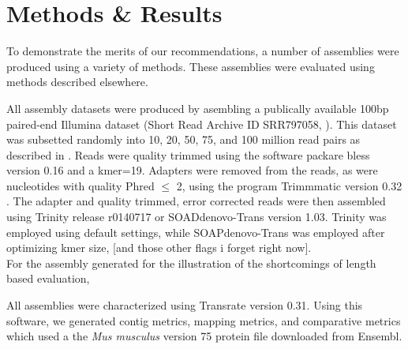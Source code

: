 \section*{Methods & Results}

To demonstrate the merits of our recommendations, a number of assemblies were produced using a variety of methods. These assemblies were evaluated using methods described elsewhere. 

All assembly datasets were produced by asembling a publically available 100bp paired-end Illumina dataset (Short Read Archive ID SRR797058, \citep{Macfarlan:2012js}). This dataset was subsetted randomly into 10, 20, 50, 75, and 100 million read pairs as described in \citep{MacManes:2014io}. Reads were quality trimmed using the software packare bless version 0.16 \citep{Heo:2014cb} and a kmer=19.  Adapters were removed from the reads, as were nucleotides with quality Phred $\leq$ 2, using the program Trimmmatic version 0.32 \citep{Bolger:2014ek}. The adapter and quality trimmed, error corrected reads were then assembled using Trinity release r0140717 or SOADdenovo-Trans version 1.03. Trinity was employed using default settings, while SOAPdenovo-Trans was employed after optimizing kmer size, [and those other flags i forget right now]. \\

For the assembly generated for the illustration of the shortcomings of length based evaluation, 

All assemblies were characterized using Transrate version 0.31. Using this software, we generated contig metrics, mapping metrics, and comparative metrics which used a the \textit{Mus musculus} version 75 protein file downloaded from Ensembl.   